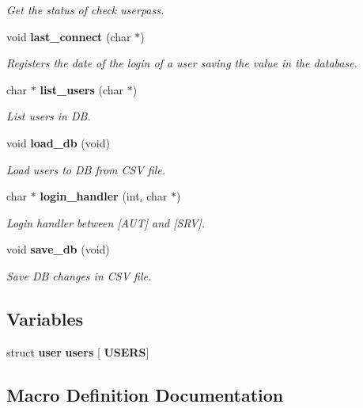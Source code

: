 \begin{DoxyCompactItemize}
\begin{DoxyCompactList}\small\item\em Get the status of check userpass. \end{DoxyCompactList}\item 
void \textbf{ last\+\_\+connect} (char $\ast$)
\begin{DoxyCompactList}\small\item\em Registers the date of the login of a user saving the value in the database. \end{DoxyCompactList}\item 
char $\ast$ \textbf{ list\+\_\+users} (char $\ast$)
\begin{DoxyCompactList}\small\item\em List users in DB. \end{DoxyCompactList}\item 
void \textbf{ load\+\_\+db} (void)
\begin{DoxyCompactList}\small\item\em Load users to DB from C\+SV file. \end{DoxyCompactList}\item 
char $\ast$ \textbf{ login\+\_\+handler} (int, char $\ast$)
\begin{DoxyCompactList}\small\item\em Login handler between [A\+UT] and [S\+RV]. \end{DoxyCompactList}\item 
void \textbf{ save\+\_\+db} (void)
\begin{DoxyCompactList}\small\item\em Save DB changes in C\+SV file. \end{DoxyCompactList}\end{DoxyCompactItemize}
\subsection*{Variables}
\begin{DoxyCompactItemize}
\item 
struct \textbf{ user} \textbf{ users} [\textbf{ U\+S\+E\+RS}]
\end{DoxyCompactItemize}


\subsection{Macro Definition Documentation}
\mbox{\label{auth_8h_a322789c10f93ef5e09a1d5f17aabf0e3}} 
